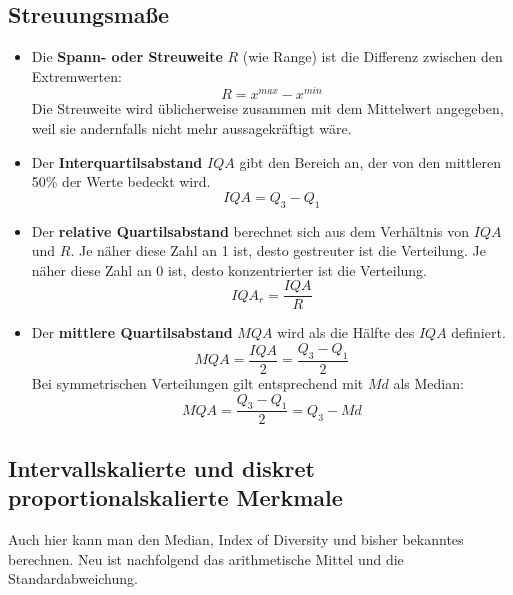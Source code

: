 \subsection{Streuungsmaße}
\begin{itemize}
    \item Die \textbf{Spann- oder Streuweite} $R$ (wie Range) ist die Differenz zwischen den Extremwerten:
    \[R = x^{max} - x^{min}\]
    Die Streuweite wird üblicherweise zusammen mit dem Mittelwert angegeben, weil sie andernfalls nicht mehr aussagekräftigt wäre.
    \item Der \textbf{Interquartilsabstand} $IQA$ gibt den Bereich an, der von den mittleren 50\% der Werte bedeckt wird.
    \[IQA = Q_3 - Q_1\]
    \item Der \textbf{relative Quartilsabstand} berechnet sich aus dem Verhältnis von $IQA$ und $R$.
    Je näher diese Zahl an 1 ist, desto gestreuter ist die Verteilung.
    Je näher diese Zahl an 0 ist, desto konzentrierter ist die Verteilung.
    \[IQA_r = \frac{IQA}{R}\]
    \item Der \textbf{mittlere Quartilsabstand} $MQA$ wird als die Hälfte des $IQA$ definiert.
    \[MQA = \frac{IQA}{2} = \frac{Q_3 - Q_1}{2}\]
    Bei symmetrischen Verteilungen gilt entsprechend mit $Md$ als Median:
    \[MQA = \frac{Q_3 - Q_1}{2} = Q_3 - Md\]
\end{itemize}

\subsection{Intervallskalierte und diskret proportionalskalierte Merkmale}
Auch hier kann man den Median, Index of Diversity und bisher bekanntes berechnen.
Neu ist nachfolgend das arithmetische Mittel und die Standardabweichung.



